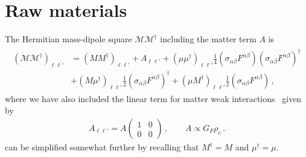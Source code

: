 \section{Raw materials}
\label{sec:raw}
The Hermitian mass-dipole square $\mathcal{M}\mathcal{M}^{\dag}$ including the matter term $A$ is
\begin{align}
    \label{hermz:1}
    \begin{split}
        (\mathcal{M}\mathcal{M}^{\dag})_{\ell\ell'}
        &=(MM^{\dag})_{\ell\ell'}+A_{\ell\ell'}+(\mu\mu^{\dag})_{\ell\ell'}\frac{1}{4}\left(\sigma_{\alpha\beta}F^{\alpha\beta}\right)\left(\sigma_{\alpha\beta}F^{\alpha\beta}\right)^{\dag}\\
        &+(M\mu^{\dag})_{\ell\ell'}\frac{1}{2}\left(\sigma_{\alpha\beta}F^{\alpha\beta}\right)^{\dag}
        +(\mu M^{\dag})_{\ell\ell'}\frac{1}{2}\left(\sigma_{\alpha\beta}F^{\alpha\beta}\right)\,,        
    \end{split}
\end{align}
where we have also included the linear term for matter weak interactions~\cite{Wolfenstein:1977ue} given by
\begin{align}
    \label{matter:1}
    A_{\ell\ell'}=A
    \begin{pmatrix}
        1 & 0\\
        0 & 0
    \end{pmatrix}\,,\qquad
    A\propto G_{F}\rho_{e}\,.
\end{align}
 can be simplified somewhat further by recalling that $M^{\dag}=M$ and $\mu^{\dag}=\mu$.





